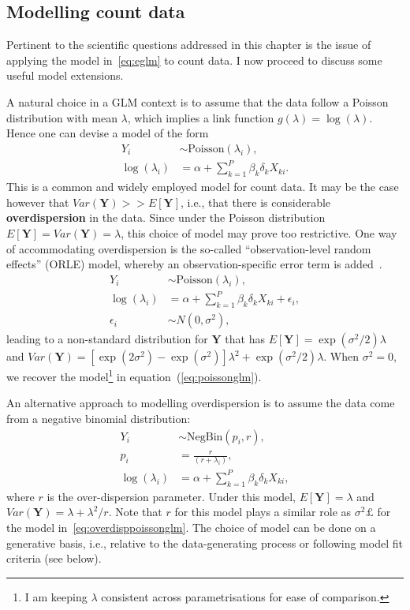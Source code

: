 \subsection{Modelling count data}
\label{sec:countmodelling}

Pertinent to the scientific questions addressed in this chapter is the issue of applying the model in~\ref{eq:eglm} to count data.
I now proceed to discuss some useful model extensions.

A natural choice in a GLM context is to assume that the data follow a Poisson distribution with mean $\lambda$, which implies a link function $g(\lambda) = \log(\lambda)$.
Hence one can devise a model of the form
\begin{align}
 \label{eq:poissonglm}
   Y_i &\sim \text{Poisson}(\lambda_i), \\
  \log(\lambda_i) &= \alpha + \sum_{k=1}^P \beta_k\delta_k X_{ki}.
\end{align}
This is a common and widely employed model for count data.
It may be the case however that $Var(\boldsymbol Y) >> E[\boldsymbol Y]$, i.e., that there is considerable \textbf{overdispersion} in the data.
Since under the Poisson distribution $ E[\boldsymbol Y] = Var(\boldsymbol Y) = \lambda$, this choice of model may prove too restrictive.
One way of accommodating overdispersion is the so-called ``observation-level random effects'' (ORLE) model, whereby an observation-specific error term is added~\citep{Hinde1982,Hill2007,Harrison2014}.
\begin{align}
 \label{eq:overdisppoissonglm}
   Y_i &\sim \text{Poisson}(\lambda_i), \\
  \log(\lambda_i) &= \alpha + \sum_{k=1}^P \beta_k\delta_k X_{ki} + \epsilon_i, \\
  \epsilon_i &\sim N(0, \sigma^2),
\end{align}
leading to a non-standard distribution for $\boldsymbol Y$ that has $E[\boldsymbol Y] =  \exp(\sigma^2/2)\lambda$ and $Var(\boldsymbol Y) = [\exp(2\sigma^2) - \exp(\sigma^2)] \lambda^2 + \exp(\sigma^2/2)\lambda$.
When $\sigma^2 = 0 $, we recover the model\footnote{I am keeping $\lambda$ consistent across parametrisations for ease of comparison.} in equation~(\ref{eq:poissonglm}).

An alternative approach to modelling overdispersion is to assume the data come from a negative binomial distribution:
\begin{align}
\label{eq:negbinglm}
 Y_i & \sim \text{NegBin}(p_i, r), \\
 p_i & = \frac{r}{(r + \lambda_i)},  \\ 
  \log(\lambda_i) &= \alpha + \sum_{k=1}^P \beta_k\delta_k X_{ki},
\end{align}
where $r$ is the over-dispersion parameter.
Under this model, $E[\boldsymbol Y] = \lambda$ and $Var(\boldsymbol Y) =  \lambda + \lambda^2/r$.
Note that $r$ for this model plays a similar role as $\sigma^2£$ for the model in~\ref{eq:overdisppoissonglm}.
The choice of model can be done on a generative basis, i.e., relative to the data-generating process or following model fit criteria (see below).


